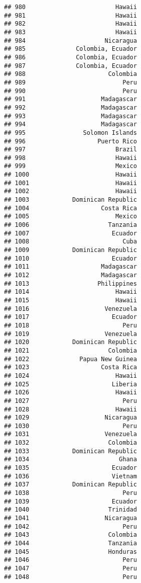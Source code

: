 \documentclass[
]{article}
\begin{document}
\begin{verbatim}
## 980                         Hawaii
## 981                         Hawaii
## 982                         Hawaii
## 983                         Hawaii
## 984                      Nicaragua
## 985              Colombia, Ecuador
## 986              Colombia, Ecuador
## 987              Colombia, Ecuador
## 988                       Colombia
## 989                           Peru
## 990                           Peru
## 991                     Madagascar
## 992                     Madagascar
## 993                     Madagascar
## 994                     Madagascar
## 995                Solomon Islands
## 996                    Puerto Rico
## 997                         Brazil
## 998                         Hawaii
## 999                         Mexico
## 1000                        Hawaii
## 1001                        Hawaii
## 1002                        Hawaii
## 1003            Dominican Republic
## 1004                    Costa Rica
## 1005                        Mexico
## 1006                      Tanzania
## 1007                       Ecuador
## 1008                          Cuba
## 1009            Dominican Republic
## 1010                       Ecuador
## 1011                    Madagascar
## 1012                    Madagascar
## 1013                   Philippines
## 1014                        Hawaii
## 1015                        Hawaii
## 1016                     Venezuela
## 1017                       Ecuador
## 1018                          Peru
## 1019                     Venezuela
## 1020            Dominican Republic
## 1021                      Colombia
## 1022              Papua New Guinea
## 1023                    Costa Rica
## 1024                        Hawaii
## 1025                       Liberia
## 1026                        Hawaii
## 1027                          Peru
## 1028                        Hawaii
## 1029                     Nicaragua
## 1030                          Peru
## 1031                     Venezuela
## 1032                      Colombia
## 1033            Dominican Republic
## 1034                         Ghana
## 1035                       Ecuador
## 1036                       Vietnam
## 1037            Dominican Republic
## 1038                          Peru
## 1039                       Ecuador
## 1040                      Trinidad
## 1041                     Nicaragua
## 1042                          Peru
## 1043                      Colombia
## 1044                      Tanzania
## 1045                      Honduras
## 1046                          Peru
## 1047                          Peru
## 1048                          Peru

\end{verbatim}
\end{document}

